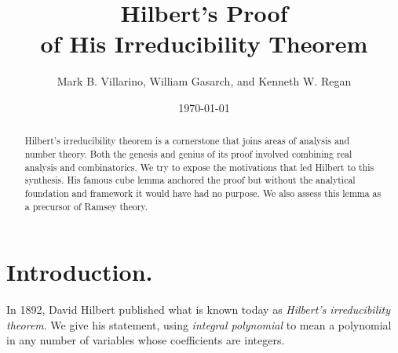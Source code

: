 \documentclass{article}
\title{ Hilbert's Proof\\ 
of His Irreducibility Theorem}
\author{
Mark B. Villarino, 
William Gasarch,
and Kenneth W. Regan}
\date{\today}
\theoremstyle{plain}
\theoremstyle{definition}
\begin{document}
\maketitle

\thispagestyle{empty} %



\begin{abstract} 
Hilbert's irreducibility theorem is a cornerstone that joins areas of
analysis and number theory. Both the genesis and genius of its proof
involved combining real analysis and combinatorics. We try to expose
the motivations that led Hilbert to this synthesis. 
His famous cube lemma anchored the proof but without the analytical foundation and framework it would have had no purpose.  
We also assess this lemma as a precursor of Ramsey theory.
\end{abstract}

\section{Introduction.}
\label{sec:intro}

In 1892, David Hilbert 
published what is 
known today as \emph{Hilbert's irreducibility theorem}.
We give his statement, using \emph{integral polynomial} to mean a polynomial in any number of variables whose coefficients are integers.
\end{document}
